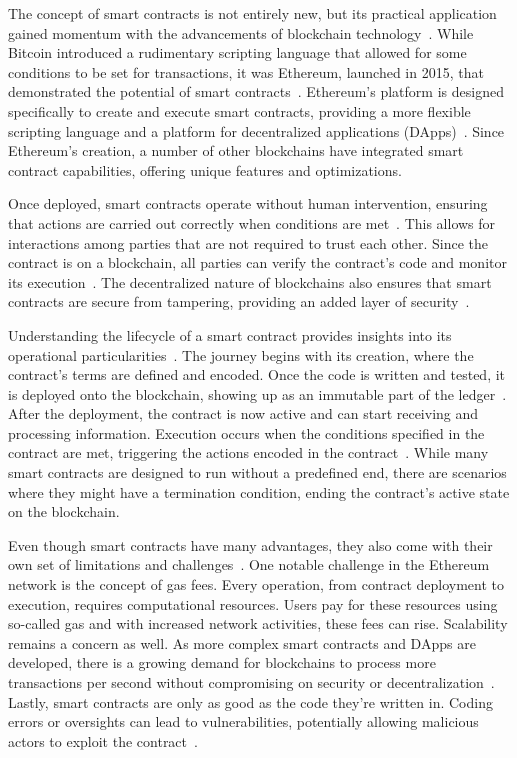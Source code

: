 The concept of smart contracts is not entirely new, but its practical application gained momentum with the advancements of blockchain technology~\cite{Pierro.}. While Bitcoin introduced a rudimentary scripting language that allowed for some conditions to be set for transactions, it was Ethereum, launched in 2015, that demonstrated the potential of smart contracts~\cite{Pierro.}. Ethereum's platform is designed specifically to create and execute smart contracts, providing a more flexible scripting language and a platform for decentralized applications (DApps)~\cite{Pierro.}. Since Ethereum's creation, a number of other blockchains have integrated smart contract capabilities, offering unique features and optimizations.

Once deployed, smart contracts operate without human intervention, ensuring that actions are carried out correctly when conditions are met~\cite{UchaniGutierrez.2023}. This allows for interactions among parties that are not required to trust each other. Since the contract is on a blockchain, all parties can verify the contract's code and monitor its execution~\cite{UchaniGutierrez.2023}. The decentralized nature of blockchains also ensures that smart contracts are secure from tampering, providing an added layer of security~\cite{Zhou.2022}.

Understanding the lifecycle of a smart contract provides insights into its operational particularities~\cite{Pierro.}. The journey begins with its creation, where the contract's terms are defined and encoded. Once the code is written and tested, it is deployed onto the blockchain, showing up as an immutable part of the ledger~\cite{Pierro.}. After the deployment, the contract is now active and can start receiving and processing information. Execution occurs when the conditions specified in the contract are met, triggering the actions encoded in the contract~\cite{Pierro.}. While many smart contracts are designed to run without a predefined end, there are scenarios where they might have a termination condition, ending the contract's active state on the blockchain.

Even though smart contracts have many advantages, they also come with their own set of limitations and challenges~\cite{.2019}. One notable challenge in the Ethereum network is the concept of gas fees. Every operation, from contract deployment to execution, requires computational resources. Users pay for these resources using so-called gas and with increased network activities, these fees can rise. Scalability remains a concern as well. As more complex smart contracts and DApps are developed, there is a growing demand for blockchains to process more transactions per second without compromising on security or decentralization~\cite{.2019}. Lastly, smart contracts are only as good as the code they're written in. Coding errors or oversights can lead to vulnerabilities, potentially allowing malicious actors to exploit the contract~\cite{Zhou.2022}.

